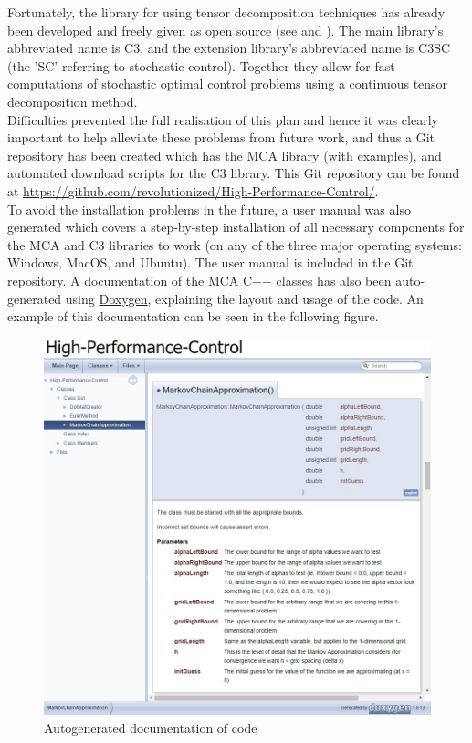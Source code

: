 \documentclass[11pt,draftd]{article}
\begin{document}
Fortunately, the library for using tensor decomposition techniques has already been developed and freely given as open source (see \cite{c3c} and \cite{c3cs}). The main library's abbreviated name is C3, and the extension library’s abbreviated name is C3SC (the 'SC' referring to stochastic control). Together they allow for fast computations of stochastic optimal control problems using a continuous tensor decomposition method. \\

Difficulties prevented the full realisation of this plan and hence it was clearly important to help alleviate these problems from future work, and thus a Git repository has been created which has the MCA library (with examples), and automated download scripts for the C3 library. This Git repository can be found at \url{https://github.com/revolutionized/High-Performance-Control/}. \\

To avoid the installation problems in the future, a user manual was also generated which covers a step-by-step installation of all necessary components for the MCA and C3 libraries to work (on any of the three major operating systems: Windows, MacOS, and Ubuntu). The user manual is included in the Git repository. A documentation of the MCA C++ classes has also been auto-generated using \href{https://www.stack.nl/~dimitri/doxygen/}{Doxygen}, explaining the layout and usage of the code. An example of this documentation can be seen in the following figure. \\
\begin{figure}[h!]
	\centering
	\label{doxygen-documentation}
	\includegraphics[scale = 0.63]{doxygen-example}
	\caption{Autogenerated documentation of code}
\end{figure}
\[\]
\end{document}
